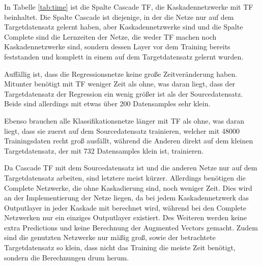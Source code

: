 In Tabelle \ref{tab:time} ist die Spalte Cascade TF, die Kaskadennetzwerke mit TF beinhaltet. Die Spalte Cascade ist diejenige, in der die Netze nur auf dem 
Targetdatensatz gelernt haben, aber Kaskadennetzwerke sind und die Spalte Complete sind die Lernzeiten der Netze, die weder TF machen noch 
Kaskadennetzwerke sind, sondern dessen Layer vor dem Training bereits feststanden und komplett in einem auf dem Targetdatensatz gelernt wurden. 

Auffällig ist, dass die Regressionsnetze keine große Zeitveränderung haben. Mitunter benötigt mit TF weniger Zeit als ohne, was daran liegt, dass 
der Targetdatensatz der Regression ein wenig größer ist als der Sourcedatensatz. Beide sind allerdings mit etwas über 200 Datensamples sehr klein. 

Ebenso brauchen alle Klassifikationsnetze länger mit TF als ohne, was daran liegt, dass sie zuerst auf dem Sourcedatensatz trainieren, welcher mit 
48000 Trainingsdaten recht groß ausfällt, während die Anderen direkt auf dem kleinen Targetdatensatz, der mit 732 Datensamples klein ist, 
trainieren. 

Da Cascade TF mit dem Sourcedatensatz ist und die anderen Netze nur auf dem Targetdatensatz arbeiten, sind letztere meist kürzer. Allerdings 
benötigen die Complete Netzwerke, die ohne Kaskadierung sind, noch weniger Zeit. Dies wird an der Implementierung der Netze liegen, da bei jedem 
Kaskadennetzwerk das Outputlayer in jeder Kaskade mit berechnet wird, während bei den Complete Netzwerken nur ein einziges Outputlayer existiert. 
Des Weiteren werden keine extra Predictions und keine Berechnung der Augmented Vectors gemacht. 
Zudem sind die genutzten Netzwerke nur mäßig groß, sowie der betrachtete Targetdatensatz so klein, dass nicht das Training die meiste Zeit 
benötigt, sondern die Berechnungen drum herum. 
